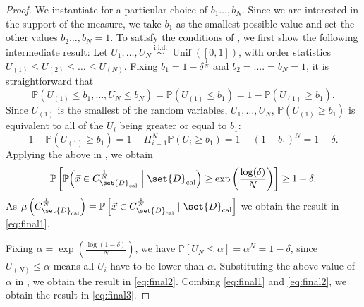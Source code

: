 \documentclass[pmlr]{jmlr}%
\begin{document}
\begin{proof}
%
We instantiate  for a particular choice of $b_1 \ldots, b_N$. Since we are interested in the support of the measure, we take $b_1$ as the smallest possible value and set the other values $b_2 \ldots, b_N = 1$.
To satisfy the conditions of , we first show the following intermediate result:
Let $U_1, \ldots, U_N \stackrel{\text { i.i.d. }}{\sim} \operatorname{Unif}([0,1])$, with order statistics $U_{(1)} \leq U_{(2)} \leq \ldots \leq U_{(N)}$.
%
%
Fixing $b_1 = 1- \delta^{\frac{ 1}{N}} $ and $b_2 = ....= b_N = 1$, it is straightforward that
$$ \mathbb{P}\left(U_{(1)} \leq b_1, \ldots, U_{N} \leq b_N\right) = \mathbb{P}\left(U_{(1)} \leq b_1 \right) = 1-\mathbb{P}\left(U_{(1)} \geq b_1 \right).$$
%
Since $U_{(1)}$ is the smallest of the random variables, $U_1, \ldots, U_N$, $\mathbb{P}\left(U_{(1)} \geq b_1 \right)$ is equivalent to all of the $U_i$ being greater or equal to $b_1$: 
%
%
$$1-\mathbb{P}\left(U_{(1)} \geq b_1 \right) = 1 -  \Pi_{i=1}^N \mathbb{P}\left(U_{i} \geq b_1 \right) = 1- (1- b_1)^N = 1-\delta.$$
%
%
Applying the above in , we obtain 
\[ \mathbb{P}\left[\mathbb{P}\Bigl( \Vec{x} \in C_{\set{D}_\mathrm{cal}}^{\frac{1}{N}} \Bigm| \set{D}_\mathrm{cal}\Bigr) \geq \exp \left(\frac{ \log (\delta)}{N}\right) \right] \geq 1-\delta.\]
As $ \mu \left(   C_{\set{D}_\mathrm{cal}}^{\frac{1}{N}}   \right) = \mathbb{P}\left[ \Vec{x} \in C_{\set{D}_\mathrm{cal}}^{\frac{1}{N}} \mid \set{D}_\mathrm{cal}\right]$ we obtain the result in \eqref{eq:final1}.
%
%

Fixing $\alpha = \exp \left(\frac{ \log ( 1 - \delta)}{N}\right)$, we have $ \mathbb{P}\left[U_{N} \leq \alpha \right] = \alpha^N =1-\delta$, since $U_{(N)} \leq \alpha$ means all $U_{i}$ have to be lower than $\alpha$.
Substituting the above value of $\alpha$ in , we obtain the result in \eqref{eq:final2}.
%
%
Combing \eqref{eq:final1} and \eqref{eq:final2}, we obtain the result in \eqref{eq:final3}.
%



\end{proof}
\end{document}
